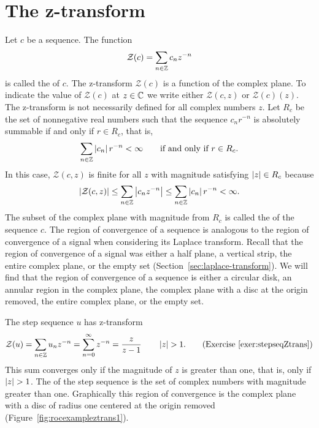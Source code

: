 \section{The z-transform}

\newcommand{\calZ}{{\mathcal Z}}

Let $c$ be a sequence.  The function
\[
\calZ(c) = \sum_{n \in \ints} c_n z^{-n}
\]
is called the  of $c$. The z-transform $\calZ(c)$ is a function of the complex plane. To indicate the value of $\calZ(c)$ at $z \in {\mathbb C}$ we write either $\calZ(c,z)$ or $\calZ(c)(z)$.  The z-transform is not necessarily defined for all complex numbers $z$.  Let $R_c$ be the set of nonnegative real numbers such that the sequence $c_n r^{-n}$ is absolutely summable if and only if $r \in R_c$, that is,
\[
\sum_{n \in {\mathbb Z}} \left\vert c_n \right\vert r^{-n} < \infty \qquad \text{if and only if $r \in R_c$}.
\]
In this case, $\calZ(c,z)$ is finite for all $z$ with magnitude satisfying $\left\vert z \right\vert \in R_c$ because 
\[
\sabs{\calZ(c,z)} \leq \sum_{n \in \ints} \abs{c_n z^{-n}} \leq \sum_{n \in \ints} \abs{c_n} r^{-n} < \infty.
\]
The subset of the complex plane with magnitude from $R_c$ is called the  of the sequence $c$.  The region of convergence of a sequence is analogous to the region of convergence of a signal when considering its Laplace transform.  Recall that the region of convergence of a signal was either a half plane, a vertical strip, the entire complex plane, or the empty set (Section~\ref{sec:laplace-transform}).  We will find that the region of convergence of a sequence is either a circular disk, an annular region in the complex plane, the complex plane with a disc at the origin removed, the entire complex plane, or the empty set.

The step sequence $u$ has z-transform
\[
\calZ(u) = \sum_{n \in \ints} u_n z^{-n} = \sum_{n=0}^\infty z^{-n} = \frac{z}{z - 1} \qquad \abs{z} > 1. \qquad \text{(Exercise~\ref{exer:stepseqZtrans})}
\]
This sum converges only if the magnitude of $z$ is greater than one, that is, only if $\left\vert z \right\vert > 1$.  The  of the step sequence is the set of complex numbers with magnitude greater than one.  Graphically this region of convergence is the complex plane with a disc of radius one centered at the origin removed (Figure~\ref{fig:rocexampleztrans1}).

